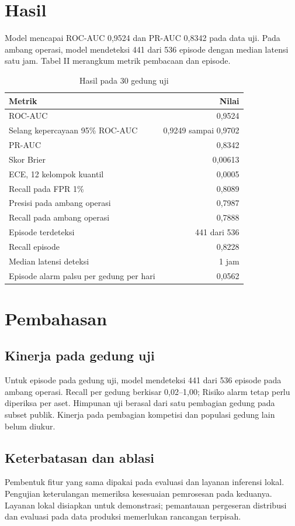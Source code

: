 \documentclass[conference]{IEEEtran}
\begin{document}
\section{Hasil}
Model mencapai ROC-AUC 0,9524 dan PR-AUC 0,8342 pada data uji. Pada ambang operasi, model mendeteksi 441 dari 536 episode dengan median latensi satu jam. Tabel II merangkum metrik pembacaan dan episode.
\begin{table}[!t]
\centering
\caption{Hasil pada 30 gedung uji}
\small
\setlength{\tabcolsep}{3pt}
\begin{tabular}{lr}
\toprule
Metrik & Nilai \\
\midrule
ROC-AUC & 0,9524 \\
Selang kepercayaan 95\% ROC-AUC & 0,9249 sampai 0,9702 \\
PR-AUC & 0,8342 \\
Skor Brier & 0,00613 \\
ECE, 12 kelompok kuantil & 0,0005 \\
Recall pada FPR 1\% & 0,8089 \\
Presisi pada ambang operasi & 0,7987 \\
Recall pada ambang operasi & 0,7888 \\
Episode terdeteksi & 441 dari 536 \\
Recall episode & 0,8228 \\
Median latensi deteksi & 1 jam \\
Episode alarm palsu per gedung per hari & 0,0562 \\
\bottomrule
\end{tabular}
\end{table}

\section{Pembahasan}
\subsection{Kinerja pada gedung uji}
Untuk episode pada gedung uji, model mendeteksi 441 dari 536 episode pada ambang operasi. Recall per gedung berkisar 0,02–1,00; Risiko alarm tetap perlu diperiksa per aset. Himpunan uji berasal dari satu pembagian gedung pada subset publik. Kinerja pada pembagian kompetisi dan populasi gedung lain belum diukur.

\subsection{Keterbatasan dan ablasi}
Pembentuk fitur yang sama dipakai pada evaluasi dan layanan inferensi lokal. Pengujian keterulangan memeriksa kesesuaian pemrosesan pada keduanya. Layanan lokal disiapkan untuk demonstrasi; pemantauan pergeseran distribusi dan evaluasi pada data produksi memerlukan rancangan terpisah.
\end{document}
